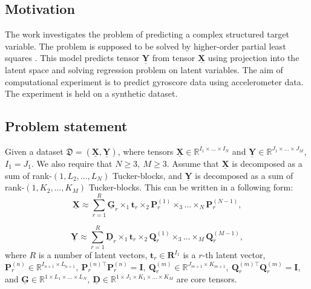 \documentclass[../../main.tex]{subfiles}
\begin{document}
\subsection{Motivation}

%
%


The work investigates the problem of predicting a complex structured target variable. The problem is supposed to be solved by higher-order partial least squares \cite{zhao2012higher}. This model predicts tensor $\underline{\mathbf{Y}}$ from tensor $\underline{\mathbf{X}}$ using projection into the latent space and solving regression problem on latent variables. The aim of computational experiment is to predict gyroscore data using accelerometer data. The experiment is held on a synthetic dataset. 

\subsection{Problem statement}

Given a dataset $\mathfrak{D} = (\underline{\mathbf{X}}, \underline{\mathbf{Y}})$, where tensors $\underline{\mathbf{X}} \in \mathbb{R}^{I_1\times \ldots\times I_N}$ and $\underline{\mathbf{Y}} \in \mathbb{R}^{J_1\times \ldots \times J_M}$, $I_1 = J_1$. We also require that $N \geq 3, ~M\geq 3$. Assume that $\underline{\mathbf{X}}$ is decomposed as a sum of rank-$(1, L_2, \ldots, L_N)$ Tucker-blocks, and $\underline{\mathbf{Y}}$ is decomposed as a sum of rank-$(1, K_2, \ldots, K_M)$ Tucker-blocks. This can be written in a following form:
\begin{equation}
\underline{\mathbf{X}} \approx \sum_{r=1}^R\underline{\mathbf{G}}_r\times_1\mathbf{t}_r\times_2\mathbf{P}^{(1)}_r\times_3\ldots \times_N\mathbf{P}_r^{(N - 1)},
\end{equation}

\begin{equation}
\underline{\mathbf{Y}} \approx \sum_{r=1}^R\underline{\mathbf{D}}_r\times_1\mathbf{t}_r\times_2\mathbf{Q}^{(1)}_r\times_3\ldots \times_M\mathbf{Q}_r^{(M - 1)},
\end{equation}
where $R$ is a number of latent vectors, $\mathbf{t}_r \in \mathbf{R}^{I_1}$ is a $r$-th latent vector, 
$\mathbf{P}_r^{(n)} \in \mathbb{R}^{I_{n+1}\times L_{n+1}}, ~\mathbf{P}_r^{(n)\top}\mathbf{P}_r^{(n)} = \mathbf{I}, ~\mathbf{Q}_r^{(m)} \in \mathbb{R}^{J_{m+1}\times K_{m + 1}}, ~\mathbf{Q}_r^{(m)\top}\mathbf{Q}_r^{(m)} = \mathbf{I}$, and $\underline{\mathbf{G}} \in \mathbb{R}^{1\times L_1\times \ldots \times L_N}, ~\underline{\mathbf{D}}\in \mathbb{R}^{1\times J_1\times K_1\times \ldots \times K_M}$ are core tensors.
\end{document}
